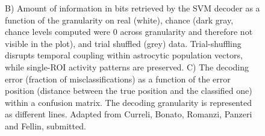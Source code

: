 \begin{figure}[h]
{    B) Amount of information in bits retrieved by the SVM decoder as a function of the granularity on real (white), chance (dark gray, chance levels computed were 0 across granularity and therefore not visible in the plot), and trial shuffled (grey) data. Trial-shuffling disrupts temporal coupling within astrocytic population vectors, while single-ROI activity patterns are preserved.
    C) The decoding error (fraction of misclassifications) as a function of the error position (distance between the true position and the classified one) within a confusion matrix. The decoding granularity is represented as different lines.
    Adapted from Curreli, Bonato, Romanzi, Panzeri and Fellin, submitted.} 
    \label{fig:chap1:seba_3}
\end{figure}






